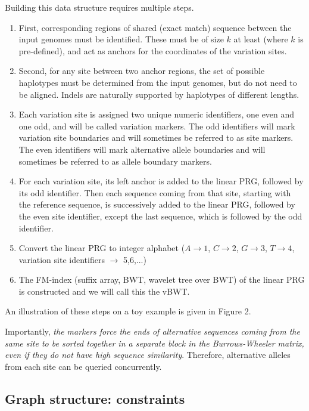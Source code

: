 \documentclass[runningheads,a4paper]{llncs}
\begin{document}
Building this data structure requires multiple steps. 
\begin{enumerate}
\item First, corresponding regions of shared (exact match) sequence between the input  genomes must be identified. These must be of size $k$ at least (where $k$ is pre-defined), and  act as anchors for the coordinates of the variation sites. 
\item Second, for any site between two anchor regions, the set of possible haplotypes must be determined from the input genomes, but  do not need to be aligned. Indels are naturally supported by haplotypes of different lengths.
\item Each variation site is assigned two unique numeric identifiers, one even and one odd, and will be called variation markers. The odd identifiers will mark variation site boundaries and will sometimes be referred to as site markers. The even identifiers will mark alternative allele boundaries and will sometimes be referred to as allele boundary markers.
\item For each variation site, its left anchor is added to the linear PRG, followed by its odd identifier. Then each sequence coming from that site, starting with the reference sequence, is successively added to the linear PRG, followed by the even site identifier, except the last sequence, which is followed by the odd identifier.
\item Convert the linear PRG to integer alphabet ($A\rightarrow 1$, $C\rightarrow2$, $G\rightarrow3$, $T\rightarrow4$, variation site identifiers $\rightarrow$ 5,6,...)
\item The FM-index (suffix array, BWT, wavelet tree over BWT) of the linear PRG is constructed and we will call this the vBWT.
\end{enumerate}

An illustration of these steps on a toy example is given in Figure 2.


Importantly, \textit{the markers force the ends of alternative sequences coming from the same site to be sorted together in a separate block in the Burrows-Wheeler matrix, even if they do not have high sequence similarity}. Therefore, alternative alleles from each site can be queried concurrently.


\subsection{Graph structure: constraints}
\end{document}
